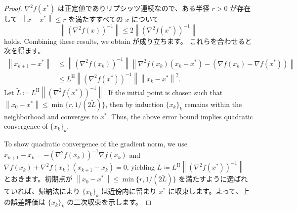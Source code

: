 \documentclass[0_main]{subfiles}
\begin{document}
\begin{proof}
    \else
        $\nabla^2 f(x^*)$ は正定値でありリプシッツ連続なので、ある半径 $r>0$ が存在して $\left\lVert x-x^* \right\rVert\le r$ を満たすすべての $x$ について
    \fi
    \begin{equation*}
        \left\lVert \left(\nabla^2 f(x)\right)^{-1} \right\rVert\le 2 \left\lVert \left(\nabla^2 f(x^*)\right)^{-1} \right\rVert
    \end{equation*}
    \ifEn
        holds.
        Combining these results, we obtain
    \else
        が成り立ちます。
        これらを合わせると次を得ます。
    \fi
    \begin{align*}
        \left\lVert x_{k+1} - x^* \right\rVert
         & \leq \left\lVert \left(\nabla^2 f(x_k)\right)^{-1} \right\rVert \left\lVert \nabla^2 f(x_k)(x_k-x^*)-\left(\nabla f(x_k)-\nabla f(x^*)\right) \right\rVert \\
         & \le L^{\mathrm{H}} \left\lVert \left(\nabla^2 f(x^*)\right)^{-1} \right\rVert \left\lVert x_k-x^* \right\rVert^2.
    \end{align*}
    \ifEn
        Let $\widetilde L \coloneqq L^{\mathrm{H}}\left\lVert \left(\nabla^2 f(x^*)\right)^{-1} \right\rVert$.
        If the initial point is chosen such that $\left\lVert x_0-x^* \right\rVert\le \min\{ r, 1/(2\widetilde L) \}$, then by induction $\{ x_k \}_k$ remains within the neighborhood and converges to $x^*$. Thus, the above error bound implies quadratic convergence of $\{ x_k \}_k$.

        To show quadratic convergence of the gradient norm, we use $x_{k+1}-x_k=-\left(\nabla^2 f(x_k)\right)^{-1}\nabla f(x_k)$ and
        $\nabla f(x_k)+\nabla^2 f(x_k)(x_{k+1}-x_k)=0$, yielding
    \else
        $\widetilde L \coloneqq L^{\mathrm{H}}\left\lVert \left(\nabla^2 f(x^*)\right)^{-1} \right\rVert$ とおきます。初期点が $\left\lVert x_0-x^* \right\rVert\le \min\{ r, 1/(2\widetilde L) \}$ を満たすように選ばれていれば、帰納法により $\{ x_k \}_k$ は近傍内に留まり $x^*$ に収束します。よって、上の誤差評価は $\{ x_k \}_k$ の二次収束を示します。


\end{proof}
\end{document}
